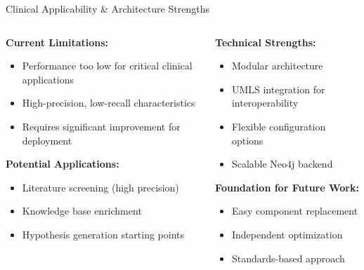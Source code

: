 \documentclass[aspectratio=169, 11pt]{beamer}
\begin{document}
\begin{frame}{Clinical Applicability \& Architecture Strengths}
    \begin{columns}
        \begin{column}{0.5\textwidth}
            \textbf{Current Limitations:}
            \begin{itemize}
                \item Performance too low for critical clinical applications
                \item High-precision, low-recall characteristics
                \item Requires significant improvement for deployment
            \end{itemize}
            
            \textbf{Potential Applications:}
            \begin{itemize}
                \item Literature screening (high precision)
                \item Knowledge base enrichment
                \item Hypothesis generation starting points
            \end{itemize}
        \end{column}
        \begin{column}{0.5\textwidth}
            \textbf{Technical Strengths:}
            \begin{itemize}
                \item \textcolor{ulgreen}{Modular architecture}
                \item \textcolor{nercolor}{UMLS integration} for interoperability
                \item \textcolor{ulgreen}{Flexible configuration} options
                \item \textcolor{nercolor}{Scalable Neo4j} backend
            \end{itemize}
            
            \textbf{Foundation for Future Work:}
            \begin{itemize}
                \item Easy component replacement
                \item Independent optimization
                \item Standards-based approach
            \end{itemize}
        \end{column}
    \end{columns}
\end{frame}
\end{document}

